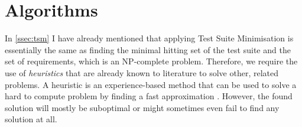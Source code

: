 
\section{Algorithms}
In \autoref{ssec:tsm} I have already mentioned that applying Test Suite Minimisation is essentially the same as finding the minimal hitting set of the test suite and the set of requirements, which is an NP-complete problem. Therefore, we require the use of \emph{heuristics} that are already known to literature to solve other, related problems. A heuristic is an experience-based method that can be used to solve a hard to compute problem by finding a fast approximation \cite{6588537}. However, the found solution will mostly be suboptimal or might sometimes even fail to find any solution at all.

